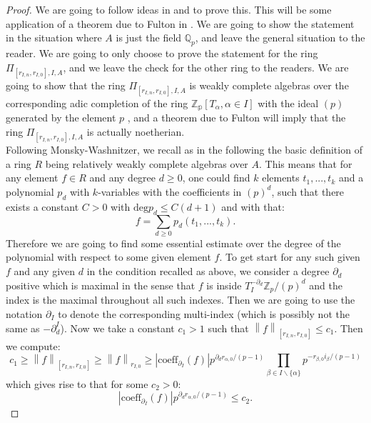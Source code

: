 \documentclass[12pt]{amsart}
\theoremstyle{definition}
\numberwithin{equation}{section}
\begin{document}
\begin{proof}
We are going to follow ideas in \cite{PZ19} and \cite{Ked9} to prove this. This will be some application of a theorem due to Fulton in \cite{Ful1}. We are going to show the statement in the situation where $A$ is just the field $\mathbb{Q}_p$, and leave the general situation to the reader. We are going to only choose to prove the statement for the ring $\Pi_{[r_{I,n},r_{I,0}],I,A}$, and we leave the check for the other ring to the readers. We are going to show that the ring $\Pi_{[r_{I,n},r_{I,0}],I,A}$ is weakly complete algebras over the corresponding adic completion of the ring $\mathbb{Z_p}[T_\alpha,\alpha\in I]$ with the ideal $(p)$ generated by the element $p$ , and a theorem due to Fulton will imply that the ring $\Pi_{[r_{I,n},r_{I,0}],I,A}$ is actually noetherian.\\
\indent Following Monsky-Washnitzer, we recall as in the following the basic definition of a ring $R$ being relatively weakly complete algebras over $A$. This means that for any element $f\in R$ and any degree $d\geq 0$, one could find $k$ elements $t_1,...,t_k$ and a polynomial $p_d$ with $k$-variables with the coefficients in $(p)^d$, such that there exists a constant $C>0$ with $\mathrm{deg}p_d\leq C(d+1)$ and with that:
\begin{displaymath}
f=\sum_{d\geq 0}p_d(t_1,...,t_k).	
\end{displaymath}
Therefore we are going to find some essential estimate over the degree of the polynomial with respect to some given element $f$. To get start for any such given $f$ and any given $d$ in the condition recalled as above, we consider a degree $\partial_d$ positive which is maximal in the sense that $f$ is inside $T_I^{-\partial_d}\mathbb{Z}_p/(p)^d$ and the index is the maximal throughout all such indexes. Then we are going to use the notation $\partial_I$ to denote the corresponding multi-index (which is possibly not the same as $-\partial_d^I$). Now we take a constant $c_1>1$ such that $\left\|f\right\|_{[r_{I,n},r_{I,0}]}\leq c_1$. Then we compute:
\begin{displaymath}
c_1\geq \left\|f\right\|_{[r_{I,n},r_{I,0}]} \geq \left\|f\right\|_{r_{I,0}} \geq |\mathrm{coeff}_{\partial_I}(f)|p^{\partial_d r_{\alpha,0}/(p-1)}\prod_{\beta\in I\backslash \{\alpha\}}p^{-r_{\beta,0} i_\beta/(p-1)}
\end{displaymath}
which gives rise to that for some $c_2>0$:
\begin{displaymath}
|\mathrm{coeff}_{\partial_I}(f)|p^{\partial_d r_{\alpha,0}/(p-1)}\leq c_2.	

\end{displaymath}
\end{proof}
\end{document}
